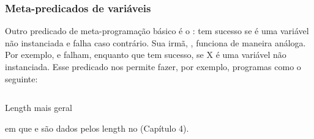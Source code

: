 \subsubsection{Meta-predicados de variáveis}

Outro predicado de meta-programação básico é o :  tem sucesso se
 é uma variável não instanciada e falha caso contrário. Sua irmã, , funciona de maneira análoga. Por exemplo,  e  falham, enquanto que  tem sucesso, se X é uma variável não instanciada.
Esse predicado nos permite fazer, por exemplo, programas como o seguinte:

    \begin{listing}
\inputminted{prolog}{../Exemplos/Cap6/prog6_glength.pl}
\caption{Length mais geral}
    \end{listing}

\noindent em que  e  são dados pelos length no (Capítulo 4).


%
